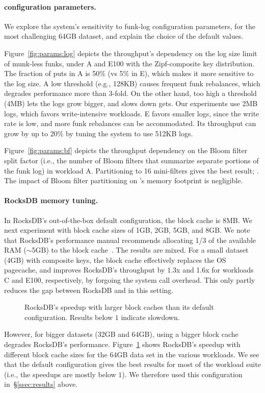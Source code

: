 {\paragraph{\sys\/ configuration parameters.} 
We explore the system's  sensitivity to funk-log configuration parameters, for the most challenging 64GB dataset, 
and explain the choice of the default values.

Figure~\ref{fig:params:log} depicts the throughput's dependency on the log size limit of munk-less funks, 
under  A and E100  with the Zipf-composite key distribution. 
The fraction of puts in A is 50\% (vs 5\% in E), which makes it more sensitive to the log size. 
A low threshold (e.g., 128KB) causes frequent funk rebalances, which degrades performance more than 3-fold. 
On the other hand, too high a threshold (4MB) lets the logs grow bigger, and slows down gets. Our experiments  
use 2MB logs, which favors write-intensive workloads. E favors smaller logs, since the write 
rate is low, and more funk rebalances can be accommodated. Its throughput can  grow by up to 20\% 
by tuning the system to use 512KB logs.

Figure~\ref{fig:params:bf} depicts the throughput dependency on the Bloom filter split factor (i.e., the 
number of Bloom filters that summarize separate portions of the funk log) in workload A. 
Partitioning to 16 mini-filters gives the best result; . 
The impact of Bloom filter partitioning on \sys's %
memory footprint is negligible.

\paragraph{RocksDB memory tuning.} In RocksDB's out-of-the-box default configuration, the block cache is 8MB. 
We next experiment with block cache sizes of 1GB, 2GB, 5GB, and 8GB. We note that 
RocksDB's performance manual recommends allocating 1/3 of the available RAM 
($\sim$5GB) to the block cache~\cite{RocksDBMemoryTuning}.
The results are mixed. For a small 
dataset (4GB) with composite keys, the block cache effectively replaces 
the OS pagecache, and improves RocksDB's throughput by $1.3$x and 1.6x
for workloads C and E100, respectively, by forgoing the system call overhead. This only partly reduces the gap between
RocksDB and \sys\/ in this setting. 

\begin{figure}[htb]
\caption{RocksDB's speedup with larger block caches than its default configuration. Results below $1$ indicate slowdown.}
\label{fig:rocks-memory}
\end{figure}

However, for  bigger datasets (32GB and 64GB),   using a  bigger 
block cache degrades  RocksDB's performance. Figure~\ref{fig:rocks-memory} shows 
RocksDB's speedup with different block cache sizes for the 64GB data set in the various workloads. 
We see that the default configuration gives the best results for most of the workload suite (i.e., the 
speedups are mostly below $1$). We therefore used this configuration  in~\S\ref{ssec:results} above.   
}

